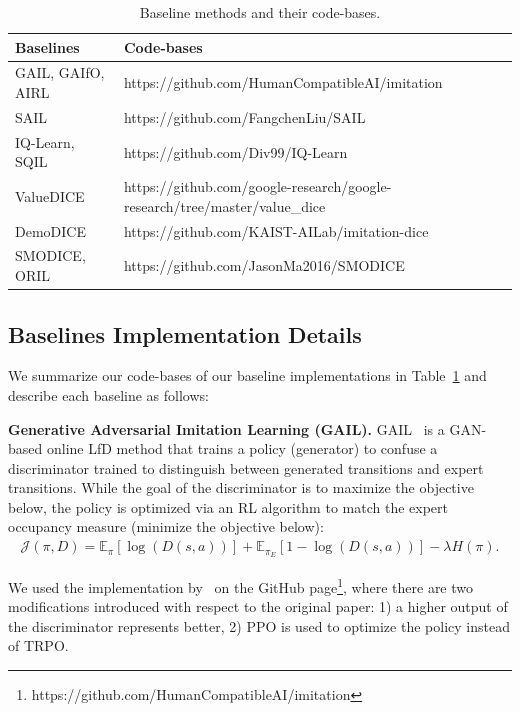 \begin{table}[htbp]
  \centering
  \small 
  \caption{Baseline methods and their code-bases. }
    \begin{tabular}{ll}
    \toprule
    Baselines \ \ \  & Code-bases \\
    \midrule
    GAIL, GAIfO, AIRL & https://github.com/HumanCompatibleAI/imitation \\
    SAIL & https://github.com/FangchenLiu/SAIL \\
    IQ-Learn, SQIL  & https://github.com/Div99/IQ-Learn \\
    ValueDICE & https://github.com/google-research/google-research/tree/master/value\_dice\\
    DemoDICE & https://github.com/KAIST-AILab/imitation-dice \\
    SMODICE, ORIL & https://github.com/JasonMa2016/SMODICE\\
    \bottomrule
    \end{tabular}%
  \label{app:tab:baselines-imp}%
\end{table}%



\subsection{Baselines Implementation Details}

We summarize our code-bases of our baseline implementations in Table~\ref{app:tab:baselines-imp} and describe each baseline as follows: 

\textbf{Generative Adversarial Imitation Learning (GAIL).} 
GAIL~\citep{ho2016generative} is a GAN-based online LfD method that trains a policy (generator) to confuse a discriminator trained to distinguish between generated transitions and expert transitions. 
While the goal of the discriminator is to maximize the objective below, the policy is optimized via an RL algorithm to match the expert occupancy measure (minimize the objective below):
\begin{align}
    \mathcal{J}(\pi, D)=\mathbb{E}_{\pi}\left[{\log(D(s,a))}\right] + \mathbb{E}_{\pi_E}\left[{1-\log(D(s,a))}\right] - \lambda H(\pi). \nonumber 
\end{align}

We used the implementation by~\citet{gleave2022imitation} on the GitHub page\footnote{https://github.com/HumanCompatibleAI/imitation}, where there are two modifications introduced with respect to the original paper: 1) a higher output of the discriminator represents better, 2) PPO is used to optimize the policy instead of TRPO.

